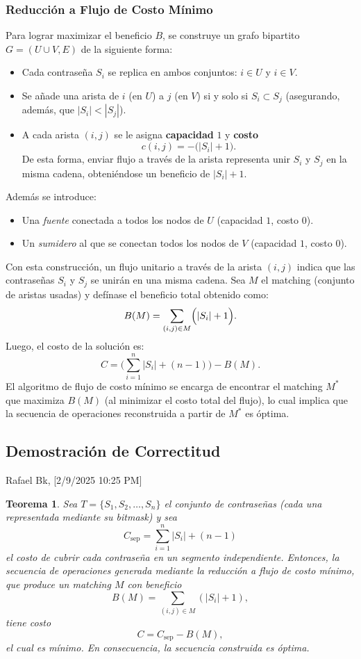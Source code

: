 ﻿\documentclass{article}
\theoremstyle{plain}
\newtheorem{theorem}{Teorema}
\theoremstyle{definition}
\begin{document}
\subsubsection{Reducción a Flujo de Costo Mínimo}
Para lograr maximizar el beneficio \(B\), se construye un grafo bipartito \(G=(U\cup V, E)\) de la siguiente forma:
\begin{itemize}
    \item Cada contraseña \(S_i\) se replica en ambos conjuntos: \(i\in U\) y \(i\in V\).
    \item Se añade una arista de \(i\) (en \(U\)) a \(j\) (en \(V\)) si y solo si \(S_i\subset S_j\) (asegurando, además, que \(|S_i| < |S_j|\)).
    \item A cada arista \((i,j)\) se le asigna \textbf{capacidad} \(1\) y \textbf{costo} 
    \[
    c(i,j) = -\bigl(|S_i|+1\bigr).
    \]
    De esta forma, enviar flujo a través de la arista representa unir \(S_i\) y \(S_j\) en la misma cadena, obteniéndose un beneficio de \(|S_i|+1\).
\end{itemize}
Además se introduce:
\begin{itemize}
    \item Una \emph{fuente} conectada a todos los nodos de \(U\) (capacidad \(1\), costo \(0\)).
    \item Un \emph{sumidero} al que se conectan todos los nodos de \(V\) (capacidad \(1\), costo \(0\)).
\end{itemize}

Con esta construcción, un flujo unitario a través de la arista \((i,j)\) indica que las contraseñas \(S_i\) y \(S_j\) se unirán en una misma cadena. Sea \(M\) el matching (conjunto de aristas usadas) y defínase el beneficio total obtenido como:
\[
B(M)= \sum_{(i,j)\in M} \Bigl(|S_i|+1\Bigr).
\]
Luego, el costo de la solución es:
\[
C = \Biggl(\sum_{i=1}^{n}|S_i|+(n-1)\Biggr) - B(M).
\]
El algoritmo de flujo de costo mínimo se encarga de encontrar el matching \(M^*\) que maximiza \(B(M)\) (al minimizar el costo total del flujo), lo cual implica que la secuencia de operaciones reconstruida a partir de \(M^*\) es óptima.

\medskip

\subsection{Demostración de Correctitud}

Rafael Bk, [2/9/2025 10:25 PM]

\begin{theorem}
Sea \(T = \{S_1,S_2,\dots,S_n\}\) el conjunto de contraseñas (cada una representada mediante su bitmask) y sea
\[
C_{\text{sep}}=\sum_{i=1}^{n}|S_i|+(n-1)
\]
el costo de cubrir cada contraseña en un segmento independiente. Entonces, la secuencia de operaciones generada mediante la reducción a flujo de costo mínimo, que produce un matching \(M\) con beneficio
\[
B(M)=\sum_{(i,j)\in M} (|S_i|+1),
\]
tiene costo
\[
C = C_{\text{sep}} - B(M),
\]
el cual es mínimo. En consecuencia, la secuencia construida es óptima.
\end{theorem}
\end{document}
